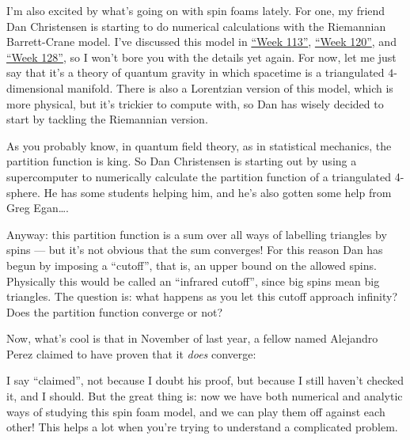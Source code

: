 \documentclass{article}
\def\tightlist{}
\renewcommand{\texttt}[1]{%
  \begingroup
  \ttfamily
  \begingroup\lccode`~=`/\lowercase{\endgroup\def~}{/\discretionary{}{}{}}%
  \begingroup\lccode`~=`[\lowercase{\endgroup\def~}{[\discretionary{}{}{}}%
  \begingroup\lccode`~=`.\lowercase{\endgroup\def~}{.\discretionary{}{}{}}%
  \catcode`/=\active\catcode`[=\active\catcode`.=\active
  \scantokens{#1\noexpand}%
  \endgroup
}
\begin{document}
I'm also excited by what's going on with spin foams lately. For one, my
friend Dan Christensen is starting to do numerical calculations with the
Riemannian Barrett-Crane model. I've discussed this model in
\protect\hyperlink{week113}{``Week 113''},
\protect\hyperlink{week120}{``Week 120''}, and
\protect\hyperlink{week128}{``Week 128''}, so I won't bore you with the
details yet again. For now, let me just say that it's a theory of
quantum gravity in which spacetime is a triangulated \(4\)-dimensional
manifold. There is also a Lorentzian version of this model, which is
more physical, but it's trickier to compute with, so Dan has wisely
decided to start by tackling the Riemannian version.

As you probably know, in quantum field theory, as in statistical
mechanics, the partition function is king. So Dan Christensen is
starting out by using a supercomputer to numerically calculate the
partition function of a triangulated 4-sphere. He has some students
helping him, and he's also gotten some help from Greg Egan\ldots.

Anyway: this partition function is a sum over all ways of labelling
triangles by spins --- but it's not obvious that the sum converges! For
this reason Dan has begun by imposing a ``cutoff'', that is, an upper
bound on the allowed spins. Physically this would be called an
``infrared cutoff'', since big spins mean big triangles. The question
is: what happens as you let this cutoff approach infinity? Does the
partition function converge or not?

Now, what's cool is that in November of last year, a fellow named
Alejandro Perez claimed to have proven that it \emph{does} converge:


I say ``claimed'', not because I doubt his proof, but because I still
haven't checked it, and I should. But the great thing is: now we have
both numerical and analytic ways of studying this spin foam model, and
we can play them off against each other! This helps a lot when you're
trying to understand a complicated problem.
\end{document}
